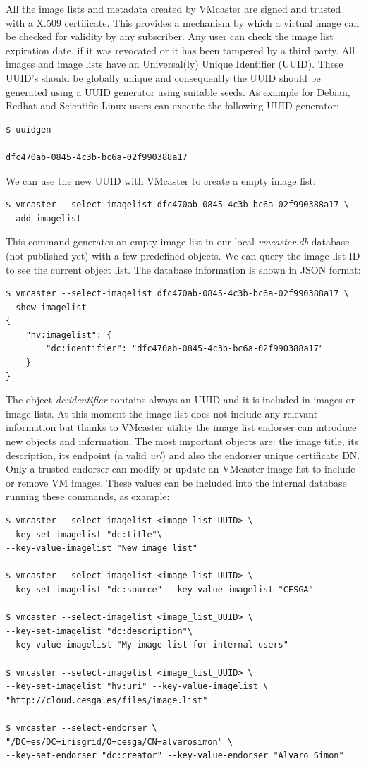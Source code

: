 \documentclass{cai}
\begin{document}
All the image lists and metadata created by VMcaster are signed and trusted with a X.509 certificate.
This provides a mechanism by which a virtual image can be checked for validity by any subscriber. Any user can check the image list expiration date, if it was revocated or it has been tampered by a third party.
All images and image lists have an Universal(ly) Unique Identifier (UUID). These UUID's should be globally unique and consequently the UUID should be generated using a UUID generator using suitable seeds. As example for Debian, Redhat and Scientific Linux users can execute the following UUID generator:
\begin{verbatim}
$ uuidgen

dfc470ab-0845-4c3b-bc6a-02f990388a17
\end{verbatim}
We can use the new UUID with VMcaster to create a empty image list:
\begin{verbatim}
$ vmcaster --select-imagelist dfc470ab-0845-4c3b-bc6a-02f990388a17 \
--add-imagelist
\end{verbatim}
This command generates an empty image list in our local \textit{vmcaster.db} database (not published yet) with a few predefined objects. We can query the image list ID to see the current object list.
The database information is shown in JSON format:
\begin{verbatim}
$ vmcaster --select-imagelist dfc470ab-0845-4c3b-bc6a-02f990388a17 \
--show-imagelist
{
    "hv:imagelist": {
        "dc:identifier": "dfc470ab-0845-4c3b-bc6a-02f990388a17"
    }
}
\end{verbatim}
The object \textit{dc:identifier} contains always an UUID and it is included in images or image lists. 
At this moment the image list does not include any relevant information but thanks to VMcaster utility the image list endorser can introduce new objects and information.
The most important objects are: the image title, its description, its endpoint (a valid \textit{url}) and also the endorser unique certificate DN. Only a trusted endorser can modify or update an VMcaster image list to include or remove VM images. 
These values can be included into the internal database running these commands, as example:
\begin{verbatim}
$ vmcaster --select-imagelist <image_list_UUID> \
--key-set-imagelist "dc:title"\ 
--key-value-imagelist "New image list"

$ vmcaster --select-imagelist <image_list_UUID> \ 
--key-set-imagelist "dc:source" --key-value-imagelist "CESGA"

$ vmcaster --select-imagelist <image_list_UUID> \ 
--key-set-imagelist "dc:description"\ 
--key-value-imagelist "My image list for internal users"

$ vmcaster --select-imagelist <image_list_UUID> \ 
--key-set-imagelist "hv:uri" --key-value-imagelist \ 
"http://cloud.cesga.es/files/image.list"

$ vmcaster --select-endorser \ 
"/DC=es/DC=irisgrid/O=cesga/CN=alvarosimon" \
--key-set-endorser "dc:creator" --key-value-endorser "Alvaro Simon"
\end{verbatim}
\end{document}
